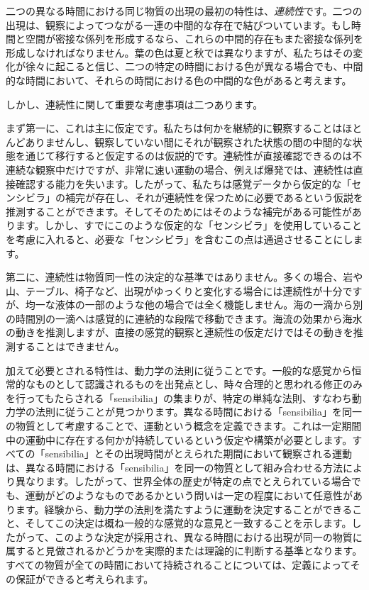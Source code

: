 \documentclass[a4paper,11pt,openany]{ltjsbook}
\begin{document}
二つの異なる時間における同じ物質の出現の最初の特性は、\textit{連続性}です。二つの出現は、観察によってつながる一連の中間的な存在で結びついています。もし時間と空間が密接な係列を形成するなら、これらの中間的存在もまた密接な係列を形成しなければなりません。葉の色は夏と秋では異なりますが、私たちはその変化が徐々に起こると信じ、二つの特定の時間における色が異なる場合でも、中間的な時間において、それらの時間における色の中間的な色があると考えます。

しかし、連続性に関して重要な考慮事項は二つあります。

まず第一に、これは主に仮定です。私たちは何かを継続的に観察することはほとんどありませんし、観察していない間にそれが観察された状態の間の中間的な状態を通じて移行すると仮定するのは仮説的です。連続性が直接確認できるのは不連続な観察中だけですが、非常に速い運動の場合、例えば爆発では、連続性は直接確認する能力を失います。したがって、私たちは感覚データから仮定的な「センシビラ」の補完が存在し、それが連続性を保つために必要であるという仮説を推測することができます。そしてそのためにはそのような補完がある可能性があります。しかし、すでにこのような仮定的な「センシビラ」を使用していることを考慮に入れると、必要な「センシビラ」を含むこの点は通過させることにします。

第二に、連続性は物質同一性の決定的な基準ではありません。多くの場合、岩や山、テーブル、椅子など、出現がゆっくりと変化する場合には連続性が十分ですが、均一な液体の一部のような他の場合では全く機能しません。海の一滴から別の時間別の一滴へは感覚的に連続的な段階で移動できます。海流の効果から海水の動きを推測しますが、直接の感覚的観察と連続性の仮定だけではその動きを推測することはできません。


加えて必要とされる特性は、動力学の法則に従うことです。一般的な感覚から恒常的なものとして認識されるものを出発点とし、時々合理的と思われる修正のみを行ってもたらされる「sensibilia」の集まりが、特定の単純な法則、すなわち動力学の法則に従うことが見つかります。異なる時間における「sensibilia」を同一の物質として考慮することで、運動という概念を定義できます。これは一定期間中の運動中に存在する何かが持続しているという仮定や構築が必要とします。すべての「sensibilia」とその出現時間がとえられた期間において観察される運動は、異なる時間における「sensibilia」を同一の物質として組み合わせる方法により異なります。したがって、世界全体の歴史が特定の点でとえられている場合でも、運動がどのようなものであるかという問いは一定の程度において任意性があります。経験から、動力学の法則を満たすように運動を決定することができること、そしてこの決定は概ね一般的な感覚的な意見と一致することを示します。したがって、このような決定が採用され、異なる時間における出現が同一の物質に属すると見做されるかどうかを実際的または理論的に判断する基準となります。すべての物質が全ての時間において持続されることについては、定義によってその保証ができると考えられます。
\end{document}
